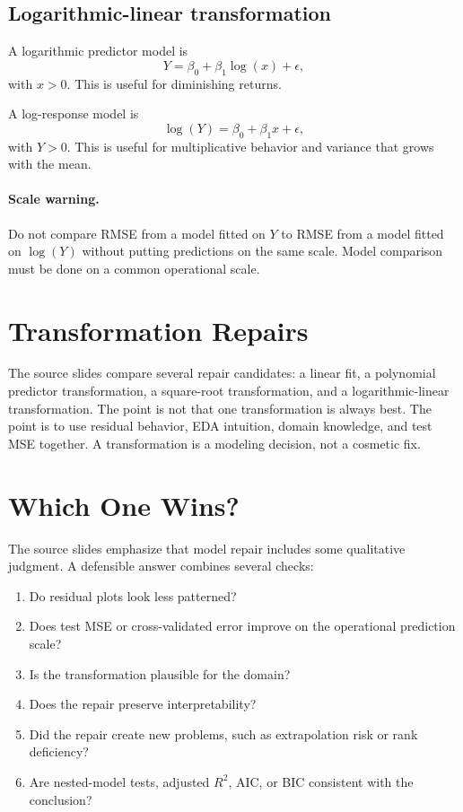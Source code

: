 {\subsection{Logarithmic-linear transformation}

A logarithmic predictor model is
\begin{equation}
  Y=\beta_0+\beta_1\log(x)+\epsilon,
\end{equation}
with \(x>0\).  This is useful for diminishing returns.

A log-response model is
\begin{equation}
  \log(Y)=\beta_0+\beta_1x+\epsilon,
\end{equation}
with \(Y>0\).  This is useful for multiplicative behavior and variance that grows with the mean.

\paragraph{Scale warning.}
Do not compare RMSE from a model fitted on \(Y\) to RMSE from a model fitted on \(\log(Y)\) without putting predictions on the same scale.  Model comparison must be done on a common operational scale.
}{
\section{Transformation Repairs}

The source slides compare several repair candidates: a linear fit, a polynomial predictor transformation, a square-root transformation, and a logarithmic-linear transformation.  The point is not that one transformation is always best.  The point is to use residual behavior, EDA intuition, domain knowledge, and test MSE together.  A transformation is a modeling decision, not a cosmetic fix.
}
\section{Which One Wins?}

The source slides emphasize that model repair includes some qualitative judgment.  A defensible answer combines several checks:
\begin{enumerate}
  \item Do residual plots look less patterned?
  \item Does test MSE or cross-validated error improve on the operational prediction scale?
  \item Is the transformation plausible for the domain?
  \item Does the repair preserve interpretability?
  \item Did the repair create new problems, such as extrapolation risk or rank deficiency?
  \item Are nested-model tests, adjusted \(R^2\), AIC, or BIC consistent with the conclusion?
\end{enumerate}

